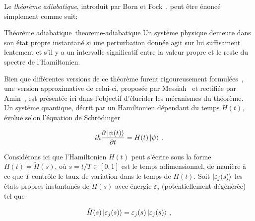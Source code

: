 Le \textit{théorème adiabatique}, introduit par Born et Fock~\cite{bornBeweisAdiabatensatzes1928}, peut être énoncé simplement comme suit:

\begin{subtheorem}{Théorème adiabatique~\cite{bornBeweisAdiabatensatzes1928}}{theoreme-adiabatique}
    Un système physique demeure dans son état propre instantané si une perturbation donnée agit sur lui suffisament lentement et s'il y a un intervalle significatif entre la valeur propre et le reste du spectre de l'Hamiltonien.
\end{subtheorem}

Bien que différentes versions de ce théorème furent rigoureusement formulées~\cite{albashAdiabaticQuantumComputing2018}, une version approximative de celui-ci, proposée par Messiah~\cite{messiahQuantumMechanics1999} et rectifiée par Amin~\cite{aminConsistencyAdiabaticTheorem2009}, est présentée ici dans l'objectif d'élucider les mécanismes du théorème. Un système quantique, décrit par un Hamiltonien dépendant du temps $H(t)$, évolue selon l'équation de Schrödinger


\begin{align*}
   i \hbar \frac{\partial \ket{\psi(t)}}{\partial t} = H(t) \ket{\psi} \,.
\end{align*}

Considérons ici que l'Hamiltonien $H(t)$ peut s'écrire sous la forme $H(t) = \tilde{H}(s)$, où $s=t/T \in [0,1]$ est le temps adimensionnel, de manière à ce que $T$ contrôle le taux de variation dans le temps de $H(t)$. Soit $\ket{\varepsilon_{j} (s)}$ les états propres instantanés de $\tilde{H}(s)$ avec énergie $\varepsilon_{j}$ (potentiellement dégénérée) tel que

\begin{equation}
   \tilde{H}(s) \ket{\varepsilon_{j}(s)} = \varepsilon_{j}(s) \ket{\varepsilon_{j}(s)} \,,
\end{equation}

